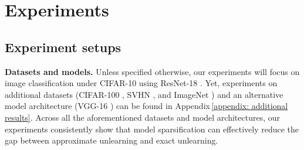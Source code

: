 
\section{Experiments}
\label{sec: exp}





\subsection{Experiment setups}
\label{sec: exp_setup}

\noindent \textbf{Datasets and models.}
Unless specified otherwise, our experiments will focus  on image classification under 
 CIFAR-10 \cite{krizhevsky2009learning}  using ResNet-18 \cite{he2016deep}. Yet,  
 experiments  on 
  additional datasets (CIFAR-100 \cite{krizhevsky2009learning}, SVHN \cite{netzer2011reading}, and ImageNet \cite{deng2009imagenet}) and an  alternative model architecture (VGG-16 \cite{simonyan2014very}) can  be found in Appendix\,\ref{appendix: additional results}.
  Across all the aforementioned datasets and model architectures, our experiments consistently show that model sparsification can effectively reduce the gap between approximate unlearning and exact unlearning. 
 
 
